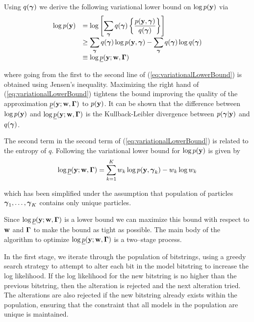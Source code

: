 Using $q({\boldsymbol \gamma})$ we derive the following variational lower bound on $\log p({\bf y})$ via
\begin{equation}
\label{eq:variationalLowerBound}
\begin{array}{rl}
\displaystyle \log p({\bf y}) 
& \displaystyle = \log \left[ \sum_{{\boldsymbol \gamma}} q({\boldsymbol \gamma}) \left\{  \frac{p({\bf y},{\boldsymbol \gamma})}{q({\boldsymbol \gamma}) } \right\} \right]
\\
& \displaystyle \ge \sum_{{\boldsymbol \gamma}} q({\boldsymbol \gamma}) \log p({\bf y},{\boldsymbol \gamma}) 
- \sum_{{\boldsymbol \gamma}} q({\boldsymbol \gamma}) \log q({\boldsymbol \gamma})
\\
& \displaystyle \equiv \log \underline{p}({\bf y};{\bf w},{\boldsymbol \Gamma})
\end{array}
\end{equation}

\noindent where going from the first to the second line of (\ref{eq:variationalLowerBound}) is 
obtained using Jensen's inequality. Maximizing the right hand  of (\ref{eq:variationalLowerBound})
tightens the bound improving the quality of the approximation $\underline{p}({\bf y};{\bf w},{\boldsymbol \Gamma})$ to
$p({\bf y})$. It can be shown that the difference between $\log p({\bf y})$ and 
$\log \underline{p}({\bf y};{\bf w},{\boldsymbol \Gamma})$ is the Kullback-Leibler divergence between $p({\boldsymbol \gamma}|{\bf y})$
and $q({\boldsymbol \gamma})$.

The second term in the second term of (\ref{eq:variationalLowerBound})
is related to the entropy of $q$. Following \cite{Rockova2017} 
the variational lower bound for
$\log p({\bf y})$
is given by
\begin{equation}\label{eq:objective}
\displaystyle \log \underline{p}({\bf y};{\bf w},{\boldsymbol \Gamma}) 
= \sum_{k=1}^K w_k\log p({\bf y},{\boldsymbol \gamma}_k) - w_k \log w_k
\end{equation}

\noindent which has been simplified under the assumption that population of particles ${\boldsymbol \gamma}_1,\ldots,{\boldsymbol \gamma}_K$ contains only unique particles.

Since $\log \underline{p}({\bf y};{\bf w},{\boldsymbol \Gamma})$ is a lower
bound we can maximize this bound with respect to ${\bf w}$ 
and ${\boldsymbol \Gamma}$ to make the bound as tight as possible.
The main body of the algorithm to optimize 
$\log \underline{p}({\bf y};{\bf w},{\boldsymbol \Gamma})$ is a two--stage process. 

In the first stage, we iterate through the population of
bitstrings, using a greedy search strategy to attempt to alter each bit in the model bitstring to increase the log likelihood. If the log likelihood for the new bitstring is no higher than the previous bitstring, then the
alteration is rejected and the next alteration tried. The alterations are also rejected if the new bitstring
already exists within the population, ensuring that the constraint that all models in the population are
unique is maintained.

